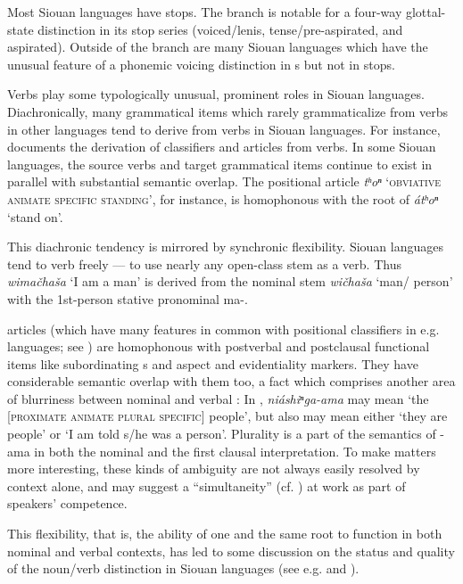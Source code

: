 \begin{refsection}
Most Siouan languages have  stops. The  branch is notable for a four-way glottal-state distinction in its stop series (voiced/lenis, tense/pre-aspirated,  and aspirated). Outside of the  branch are many Siouan languages which have the unusual feature of a phonemic voicing distinction in s but not in stops.


Verbs play some typologically unusual, prominent roles in Siouan languages. Diachronically, many grammatical items which rarely grammaticalize from verbs in other languages tend to derive from verbs in Siouan languages. For instance, \citet{Rankin1977} documents the derivation of classifiers and articles from verbs. In some Siouan languages, the source verbs and target grammatical items continue to exist in parallel with substantial semantic overlap. The  positional article \textit{tʰoⁿ} `\textsc{obviative animate specific standing}', for instance, is homophonous with the root of \textit{\'atʰoⁿ} `stand on'.


This diachronic tendency is mirrored by synchronic flexibility. Siouan languages tend to verb freely --- to use nearly any open-class stem as a verb. Thus  \textit{wima\v{c}ha\v{s}a} `I am a man' is derived from the nominal stem \textit{wi\v{c}ha\v{s}a} `man/ person' with the 1st-person stative pronominal ma-.

 articles (which have many features in common with positional classifiers in e.g.  languages; see \citealt{Gordon2009}) are homophonous with postverbal and postclausal functional items like subordinating s and aspect and evidentiality markers. They have considerable semantic overlap with them too, a fact which comprises another area of blurriness between nominal and verbal : In , \textit{ni\'ashiⁿga-ama} may mean `the [\textsc{proximate animate plural specific}] people', but also may mean either `they are people' or `I am told s/he was a person'. Plurality is a part of the semantics of -ama in both the nominal and the first clausal interpretation. To make matters more interesting, these kinds of ambiguity are not always easily resolved by context alone, and may suggest a ``simultaneity'' (cf. \citealt{Woolard1998}) at work as part of speakers' competence. 


This flexibility, that is, the ability of one and the same root to function in both nominal and verbal contexts, has led to some discussion on the status and quality of the noun/verb distinction in Siouan languages (see e.g. \citealt{Helmbrecht2002}  and \citet{Ingham2001}). 


\end{refsection}
